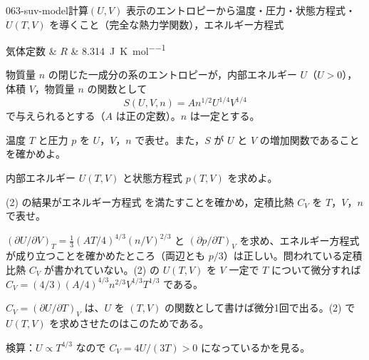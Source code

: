 \documentclass[uplatex,dvipdfmx,a4paper,11pt]{jsarticle}
\begin{document}
\begin{mondai}{063-suv-model}{計算}{$(U,V)$ 表示のエントロピーから温度・圧力・状態方程式・$U(T,V)$ を導くこと（完全な熱力学関数），エネルギー方程式}
\begin{teisuu}
  気体定数 & $R$ & \qty{8.314}{\joule\per\kelvin\per\mole}\\
\end{teisuu}
物質量 $n$ の閉じた一成分の系のエントロピーが，内部エネルギー $U$（$U > 0$），体積 $V$，物質量 $n$ の関数として
  \[ S(U,V,n) = An^{1/2}U^{1/4}V^{1/4} \]
  で与えられるとする（$A$ は正の定数）。$n$ は一定とする。
  \begin{shoumon}
    \item 温度 $T$ と圧力 $p$ を $U$，$V$，$n$ で表せ。また，$S$ が $U$ と $V$ の増加関数であることを確かめよ。
    \item 内部エネルギー $U(T,V)$ と状態方程式 $p(T,V)$ を求めよ。
    \item (2) の結果がエネルギー方程式  を満たすことを確かめ，定積比熱 $C_{V}$ を $T$，$V$，$n$ で表せ。
  \end{shoumon}

\begin{kotaeran}
   $(\partial U/\partial V)_{T}=\frac{1}{3}(AT/4)^{4/3}(n/V)^{2/3}$ と $(\partial p/\partial T)_{V}$ を求め、エネルギー方程式が成り立つことを確かめたところ（両辺とも $p/3$）は正しい。問われている定積比熱 $C_{V}$ が書かれていない。(2) の $U(T,V)$ を $V$ 一定で $T$ について微分すれば $C_{V}=(4/3)(A/4)^{4/3}n^{2/3}V^{1/3}T^{1/3}$ である。
\end{kotaeran}
\begin{rikai}
  \item $C_{V}=(\partial U/\partial T)_{V}$ は、$U$ を $(T,V)$ の関数として書けば微分1回で出る。(2) で $U(T,V)$ を求めさせたのはこのためである。
  \item 検算：$U\propto T^{4/3}$ なので $C_{V}=4U/(3T)>0$ になっているかを見る。
\end{rikai}
\end{mondai}
\end{document}
